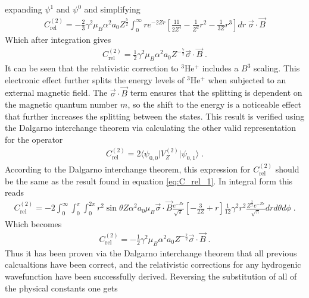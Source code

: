             \noindent expanding $\psi^1$ and $\psi^0$ and simplifying
            \begin{align}
                C_{\text{rel}}^{(2)} = -\frac{2}{3} \gamma^2 \mu_B \alpha^2 a_0 Z^{\frac{5}{2}} \int_0^\infty r e^{-2Zr} \left[ \frac{11}{2Z^4} - \frac{1}{Z^2}r^2 - \frac{1}{3Z} r^3 \right] dr \; \vec{\sigma} \cdot \vec{B}
            \end{align}
            \normalsize
            \noindent Which after integration gives 
            \begin{align}
                C_{\text{rel}}^{(2)} = \frac{1}{2} \gamma^2 \mu_B \alpha^2 a_0 Z^{-\frac{7}{2}} \vec{\sigma} \cdot \vec{B} \;. \label{eq:C_rel_1}
            \end{align}
            \noindent It can be seen that the relativistic correction to $^3$He$^+$ includes a $B^3$ scaling. This electronic effect further splits the energy levels of $^3$He$^+$ when subjected to an external magnetic field. The $\vec{\sigma} \cdot \vec{B}$ term ensures that the splitting is dependent on the magnetic quantum number $m$, so the shift to the energy is a noticeable effect that further increases the splitting between the states. This result is verified using the Dalgarno interchange theorem via calculating the other valid representation for the operator
            \begin{align}
                C_{\text{rel}}^{(2)} = 2\langle \psi_{0,0} \vert V_{Z}^{(2)} \vert \psi_{0,1}\rangle\;.
            \end{align}
            According to the Dalgarno interchange theorem, this expression for $C_{\text{rel}}^{(2)}$ should be the same as the result found in equation \eqref{eq:C_rel_1}. In integral form this reads 
            \footnotesize
            \begin{align}
                C_{\text{rel}}^{(2)} = -2\int_0^\infty \int_0^\pi \int_0^{2\pi} r^2 \sin\theta Z \alpha^2 a_0 \mu_B \vec{\sigma} \cdot \vec{B} \frac{e^{-Zr}}{\sqrt{\pi}} \left[ - \frac{3}{2Z} + r \right] \frac{1}{12} \gamma^2 r^2 \frac{Z^{\frac{3}{2}} e^{-Zr}}{\sqrt{\pi}} dr d\theta d\phi\;.
            \end{align}
            \normalsize Which becomes
            \begin{align}
                C_{\text{rel}}^{(2)} = -\frac{1}{2} \gamma^2 \mu_B \alpha^2 a_0 Z^{-\frac{7}{2}} \vec{\sigma} \cdot \vec{B} \;. \label{eq:C_rel_2}
            \end{align}
            \noindent Thus it has been proven via the Dalgarno interchange theorem that all previous calcualtions have been correct, and the relativistic corrections for any hydrogenic wavefunction have been successfully derived. Reversing the substitution of all of the physical constants one gets 
